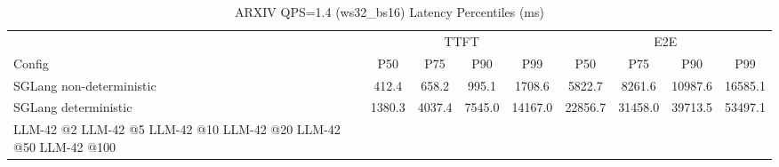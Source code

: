 \begin{table}[htbp]
\centering
\caption{ARXIV QPS=1.4 (ws32_bs16) Latency Percentiles (ms)}
\label{tab:arxiv_qps1.4_ws32_bs16}
\begin{tabular}{l|cccc|cccc}
\toprule
& \multicolumn{4}{c|}{TTFT} & \multicolumn{4}{c}{E2E} \\
Config & P50 & P75 & P90 & P99 & P50 & P75 & P90 & P99 \\
\midrule
SGLang non-deterministic & 412.4 & 658.2 & 995.1 & 1708.6 & 5822.7 & 8261.6 & 10987.6 & 16585.1 \\
SGLang deterministic & 1380.3 & 4037.4 & 7545.0 & 14167.0 & 22856.7 & 31458.0 & 39713.5 & 53497.1 \\
LLM-42 @2%
LLM-42 @5%
LLM-42 @10%
LLM-42 @20%
LLM-42 @50%
LLM-42 @100%
\bottomrule
\end{tabular}
\end{table}
